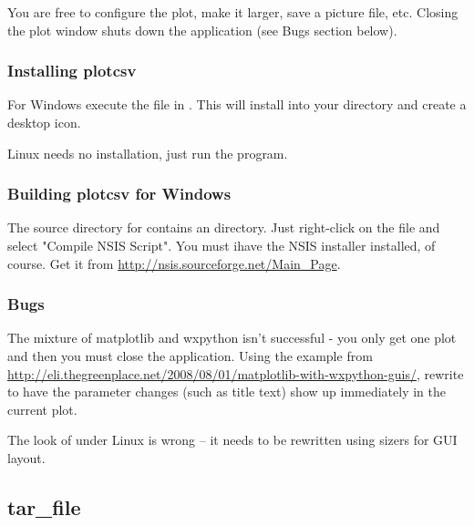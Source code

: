 \documentclass{manual}
\begin{document}
You are free to configure the plot, make it larger, save a picture file, etc.  Closing
the plot window shuts down the application (see Bugs section below).

\pagebreak

\subsubsection{Installing plotcsv}
\label{subsubsec:plotcsv_install}

For Windows execute the  file in .
This will install  into your  directory and create a desktop icon.

Linux needs no installation, just run the program.

\subsubsection{Building plotcsv for Windows}
\label{subsubsec:plotcsv_build}

The source directory for  contains an  directory.  Just right-click
on the  file and select "Compile NSIS Script".  You must ihave the NSIS installer installed, of course.
Get it from \url{http://nsis.sourceforge.net/Main_Page}.

\subsubsection{Bugs}
\label{subsubsec:plotcsv_bugs}

The mixture of matplotlib and wxpython isn't successful - you only get one plot and then you must
close the application.  Using the  example from
\url{http://eli.thegreenplace.net/2008/08/01/matplotlib-with-wxpython-guis/},
rewrite  to have the parameter changes (such as title text) show up immediately in the current plot.

The look of  under Linux is wrong -- it needs to be rewritten using sizers for GUI layout.

\pagebreak

\subsection{tar_file}
\label{subsec:tar_file}
\end{document}
